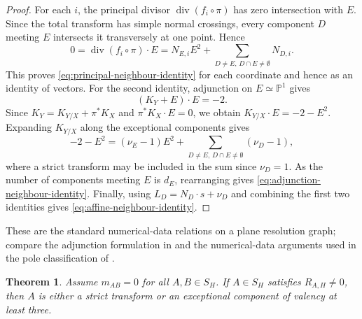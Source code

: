 \documentclass[12pt]{amsart}
\numberwithin{equation}{section}
\theoremstyle{plain}
\newtheorem{theorem}{Theorem}[section]
\theoremstyle{definition}
\theoremstyle{remark}
\theoremstyle{definition}
\begin{document}
\begin{proof}
For each $i$, the principal divisor $\operatorname{div}(f_i\circ\pi)$ has zero intersection with $E$. Since the total transform has simple normal crossings, every component $D$ meeting $E$ intersects it transversely at one point. Hence
\begin{equation*}
0=\operatorname{div}(f_i\circ\pi)\cdot E=N_{E,i}E^2+\sum_{D\neq E,\, D\cap E\neq \emptyset}N_{D,i}.
\end{equation*}
This proves \eqref{eq:principal-neighbour-identity} for each coordinate and hence as an identity of vectors. For the second identity, adjunction on $E\simeq\mathbb P^1$ gives
\begin{equation*}
(K_Y+E)\cdot E=-2.
\end{equation*}
Since $K_Y=K_{Y/X}+\pi^*K_X$ and $\pi^*K_X\cdot E=0$, we obtain $K_{Y/X}\cdot E=-2-E^2$. Expanding $K_{Y/X}$ along the exceptional components gives
\begin{equation*}
-2-E^2=(\nu_E-1)E^2+\sum_{D\ne E,\,D\cap E\ne\emptyset}(\nu_D-1),
\end{equation*}
where a strict transform may be included in the sum since $\nu_D=1$. As the number of components meeting $E$ is $d_E$, rearranging gives \eqref{eq:adjunction-neighbour-identity}. Finally, using $L_D=N_D\cdot s+\nu_D$ and combining the first two identities gives \eqref{eq:affine-neighbour-identity}.
\end{proof}

These are the standard numerical-data relations on a plane resolution graph; compare the adjunction formulation in \cite[\S2.3.1]{NemethiVeys2012} and the numerical-data arguments used in the pole classification of \cite{Veys1995}.

\begin{theorem}\label{thm:selected-component-classification}
Assume $m_{AB}=0$ for all $A, B\in S_H$. If $A\in S_H$ satisfies $R_{A,H}\neq 0$, then $A$ is either a strict transform or an exceptional component of valency at least three. 
\end{theorem}
\end{document}
